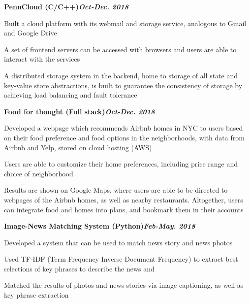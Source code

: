 \bf PennCloud (C/C++)\hfill{\it Oct-Dec. 2018}\rm\\
\vspace{-4mm}
\begin{list2}
\item Built a cloud platform with its webmail and storage service, analogous to Gmail and Google Drive
\item A set of frontend servers can be accessed with browsers and users are able to interact with the services
\item  A distributed storage system in the backend, home to storage of all state and key-value store abstractions, is built to guarantee the consistency of storage by achieving load balancing and fault tolerance
\end{list2}

\bf  Food for thought (Full stack)\hfill{\it Oct-Dec. 2018}\rm\\
\vspace{-4mm}
\begin{list2}
\item Developed a webpage which recommends Airbnb homes in NYC to users based on their food 
preference and food options in the neighborhoods, with data from Airbnb and Yelp, stored on cloud hosting (AWS) 
\item Users are able to customize their home preferences, including price range and choice of neighborhood 
\item Results are shown on Google Maps, where users are able to be directed to webpages of  the Airbnb homes, as well as nearby restaurants. Altogether, users can integrate food and homes into plans,  and bookmark them in their accounts
\end{list2}

\bf  Image-News Matching System (Python)\hfill{\it Feb-May. 2018}\rm\\
\vspace{-4mm}
\begin{list2}
\item Developed a system that can be used to match news story and news photos
\item Used TF-IDF (Term Frequency Inverse Document Frequency) to extract best selections of key phrases to describe the news and
\item Matched the results of photos and news stories via image captioning, as well as key phrase extraction \\
\end{list2}



